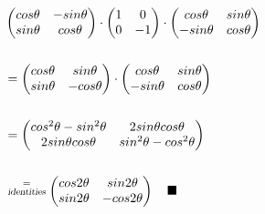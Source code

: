 \documentclass{article}
\newcommand{\proofend}{\quad\blacksquare}
\begin{document}
\begin{enumerate}
        \begin{align*}
            &\begin{pmatrix}
                cos\theta&-sin\theta\\
                sin\theta&cos\theta
            \end{pmatrix}
            \cdot
            \begin{pmatrix}
                1&0\\0&-1
            \end{pmatrix}
            \cdot
            \begin{pmatrix}
                cos\theta&sin\theta\\-sin\theta&cos\theta
            \end{pmatrix}\\\\
            &= \begin{pmatrix}
                cos\theta&sin\theta\\
                sin\theta&-cos\theta
            \end{pmatrix}
            \cdot
            \begin{pmatrix}
                cos\theta&sin\theta\\-sin\theta&cos\theta
            \end{pmatrix}\\\\
            &= \begin{pmatrix}
                cos^2\theta-sin^2\theta&2sin\theta cos\theta\\
                2sin\theta cos\theta&sin^2\theta -cos^2\theta
            \end{pmatrix}\\\\
            &\stackrel{=}{\textsl{\scriptsize identities}}
            \begin{pmatrix}
                cos2\theta&sin2\theta\\
                sin2\theta&-cos2\theta
            \end{pmatrix}\proofend
        \end{align*}


\end{enumerate}
\end{document}
